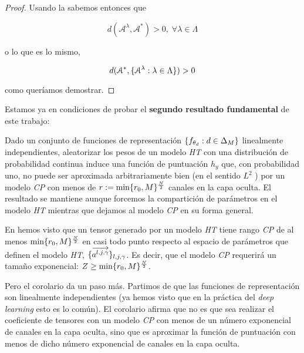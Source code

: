 \begin{proof}
    Usando la  sabemos entonces que

    \begin{equation}
        d(\mathcal{A}^\lambda, \mathcal{A}^*) > 0,
        \; \forall \lambda \in \Lambda
    \end{equation}

    o lo que es lo mismo,

    \begin{equation}
        d(\mathcal{A}^*, \{ \mathcal{A}^\lambda: \lambda \in \Lambda \}) > 0
    \end{equation}

    como queríamos demostrar.

\end{proof}

Estamos ya en condiciones de probar el \textbf{segundo resultado fundamental} de este trabajo:


\begin{corolario} \label{corolario:corolario_principal_concreto}
    Dado un conjunto de funciones de representación $\{ f_{\theta_d}: d \in \Delta_{M} \}$ linealmente independientes, aleatorizar los pesos de un modelo \textit{HT} con una distribución de probabilidad continua induce una función de puntuación $h_y$ que, con probabilidad uno, no puede ser aproximada arbitrariamente bien (en el sentido $L^2$ ) por un modelo \textit{CP} con menos de $r := \min \{ r_0, M \}^{\frac{N}{2}}$ canales en la capa oculta. El resultado se mantiene aunque forcemos la compartición de parámetros en el modelo \textit{HT} mientras que dejamos al modelo \textit{CP} en su forma general.
\end{corolario}

\begin{observacion}
    En  hemos visto que un tensor generado por un modelo \textit{HT} tiene rango \textit{CP} de al menos $\min \{ r_0, M \}^{\frac{N}{2}}$  en casi todo punto respecto al espacio de parámetros que definen el modelo \textit{HT}, $\{ \overrightarrow{a^{l, j, \gamma}} \}_{l, j, \gamma}$. Es decir, que el modelo \textit{CP} requerirá un tamaño exponencial: $Z \geq \min \{ r_0, M \}^{\frac{N}{2}}$.

    Pero el corolario da un paso más. Partimos de que las funciones de representación son linealmente independientes (ya hemos visto que en la práctica del \textit{deep learning} esto es lo común). El corolario afirma que no es que sea  realizar el coeficiente de tensores con un modelo \textit{CP} con menos de un número exponencial de canales en la capa oculta, sino que es  aproximar la función de puntuación con menos de dicho número exponencial de canales en la capa oculta.
\end{observacion}

